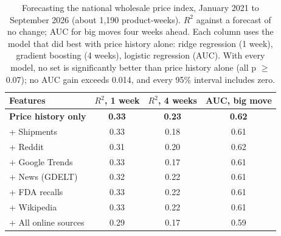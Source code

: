 \documentclass[
  11pt,
]{article}
\begin{document}
\begin{table}[htbp]
\centering\small
\caption{Forecasting the national wholesale price index, January 2021 to September 2026 (about 1,190 product-weeks). $R^2$ against a forecast of no change; AUC for big moves four weeks ahead. Each column uses the model that did best with price history alone: ridge regression (1 week), gradient boosting (4 weeks), logistic regression (AUC). With every model, no set is significantly better than price history alone (all p $\geq$ 0.07); no AUC gain exceeds 0.014, and every 95\% interval includes zero.}
\begin{tabular}{lccc}
\toprule
Features & $R^2$, 1 week & $R^2$, 4 weeks & AUC, big move \\
\midrule
\textbf{Price history only} & \textbf{0.33} & \textbf{0.23} & \textbf{0.62} \\
\addlinespace
+ Shipments & 0.33 & 0.18 & 0.61 \\
+ Reddit & 0.31 & 0.20 & 0.62 \\
+ Google Trends & 0.33 & 0.17 & 0.61 \\
+ News (GDELT) & 0.32 & 0.22 & 0.61 \\
+ FDA recalls & 0.33 & 0.22 & 0.61 \\
+ Wikipedia & 0.33 & 0.22 & 0.61 \\
+ All online sources & 0.29 & 0.17 & 0.59 \\
\bottomrule
\end{tabular}
\end{table}
\end{document}
